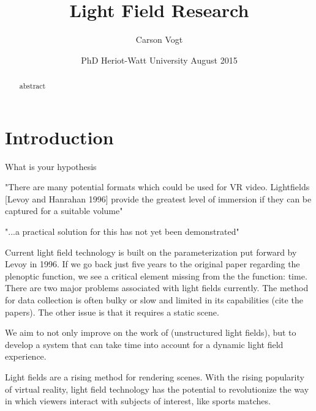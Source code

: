 \documentclass[12pt]{report}
\begin{document}
\title{Light Field Research \vspace{2.5cm}}	%
\author{
\Large Carson Vogt \vspace{1cm} \\ 
}

\date{
	\centering
	PhD \endgraf\medskip
	Heriot-Watt University \endgraf{} August 2015
}

\maketitle

\begin{abstract}
\begin{small}
abstract
\end{small}
\end{abstract}

\listoffigures

\tableofcontents

\chapter{Introduction}
What is your hypothesis

"There are many potential formats which could be used for VR video.
Lightfields [Levoy and Hanrahan 1996] provide the greatest level of
immersion if they can be captured for a suitable volume"

"...a practical solution for this has not yet been demonstrated"

Current light field technology is built on the parameterization put forward by Levoy in 1996. If we go back just five years to the original paper regarding the plenoptic function, we see a critical element missing from the the function: time. There are two major problems associated with light fields currently. The method for data collection is often bulky or slow and limited in its capabilities (cite the papers). The other issue is that it requires a static scene. 

We aim to not only improve on the work of (unstructured light fields), but to develop a system that can take time into account for a dynamic light field experience. 

Light fields are a rising method for rendering scenes. With the rising popularity of virtual reality, light field technology has the potential to revolutionize the way in which viewers interact with subjects of interest, like sports matches.
\end{document}
